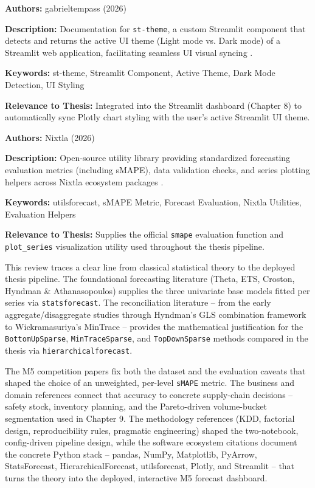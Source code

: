 {

	\textbf{Authors:}
	gabrieltempass (2026)

	\textbf{Description:}
	Documentation for \texttt{st-theme}, a custom Streamlit component that detects and returns the active UI theme (Light mode vs. Dark mode) of a Streamlit web application, facilitating seamless UI visual syncing \autocite{StTheme:2026}.

	\textbf{Keywords:}
	st-theme, Streamlit Component, Active Theme, Dark Mode Detection, UI Styling

	\textbf{Relevance to Thesis:}
	Integrated into the Streamlit dashboard (Chapter 8) to automatically sync Plotly chart styling with the user's active Streamlit UI theme.

}

{

	\textbf{Authors:}
	Nixtla (2026)

	\textbf{Description:}
	Open-source utility library providing standardized forecasting evaluation metrics (including sMAPE), data validation checks, and series plotting helpers across Nixtla ecosystem packages \autocite{UtilsForecast:2026}.

	\textbf{Keywords:}
	utilsforecast, sMAPE Metric, Forecast Evaluation, Nixtla Utilities, Evaluation Helpers

	\textbf{Relevance to Thesis:}
	Supplies the official \texttt{smape} evaluation function and \texttt{plot\_series} visualization utility used throughout the thesis pipeline.

}


\STANDARD{}
{

	This review traces a clear line from classical statistical theory to the deployed thesis pipeline. The foundational forecasting literature (Theta, ETS, Croston, Hyndman \& Athanasopoulos) supplies the three univariate base models fitted per series via \texttt{statsforecast}. The reconciliation literature -- from the early aggregate/disaggregate studies through Hyndman's GLS combination framework to Wickramasuriya's MinTrace -- provides the mathematical justification for the \texttt{BottomUpSparse}, \texttt{MinTraceSparse}, and \texttt{TopDownSparse} methods compared in the thesis via \texttt{hierarchicalforecast}.

	The M5 competition papers fix both the dataset and the evaluation caveats that shaped the choice of an unweighted, per-level \texttt{sMAPE} metric. The business and domain references connect that accuracy to concrete supply-chain decisions -- safety stock, inventory planning, and the Pareto-driven volume-bucket segmentation used in Chapter 9. The methodology references (KDD, factorial design, reproducibility rules, pragmatic engineering) shaped the two-notebook, config-driven pipeline design, while the software ecosystem citations document the concrete Python stack -- pandas, NumPy, Matplotlib, PyArrow, StatsForecast, HierarchicalForecast, utilsforecast, Plotly, and Streamlit -- that turns the theory into the deployed, interactive M5 forecast dashboard.

}
